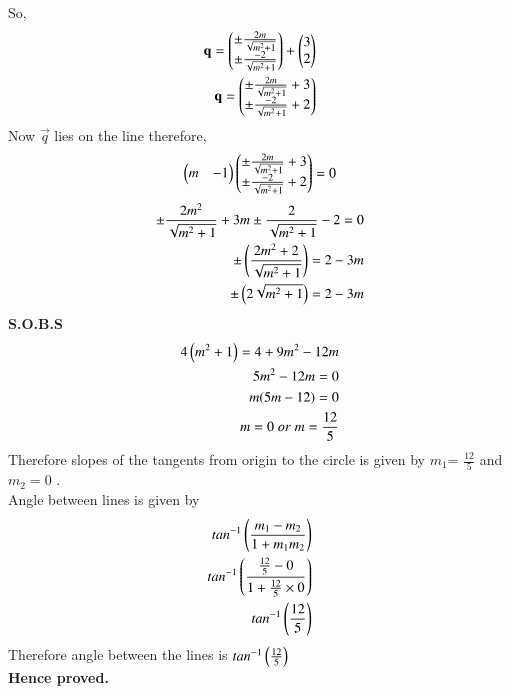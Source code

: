 \documentclass[journal,12pt,twocolumn]{IEEEtran}
\begin{document}
So,
\begin{align}
    \mathbf{q}=\begin{pmatrix}\pm \frac{2m}{\sqrt{m^2+1}} \\ \pm \frac{-2}{\sqrt{m^2+1}} \end{pmatrix} + \begin{pmatrix}3 \\ 2\end{pmatrix}\\
    \mathbf{q}= \begin{pmatrix}\pm \frac{2m}{\sqrt{m^2+1} }+3 \\ \pm \frac{-2}{\sqrt{m^2+1}} +2\end{pmatrix}
\end{align}
Now $\vec{q}$ lies on the line therefore,
\begin{align}
   \begin{pmatrix}m & -1\end{pmatrix} \begin{pmatrix}\pm \frac{2m}{\sqrt{m^2+1} }+3 \\ \pm \frac{-2}{\sqrt{m^2+1}} +2\end{pmatrix}  = 0
\end{align}
\begin{align}
    \pm \frac{2m^2}{\sqrt{m^2+1}}+ 3m  \pm\frac{2}{\sqrt{m^2+1}} -2=0 \\
    \pm\left(\frac{2m^2 + 2}{\sqrt{m^2+1}}\right)= 2-3m\\
    \pm \left(2\sqrt{m^2+1}\right)= 2-3m
\end{align}
\textbf{S.O.B.S}
\begin{align}
    4\left(m^2+1\right)=4 + 9m^2 -12m\\
    5m^2-12m=0\\
    m(5m-12)=0\\
    m=0 \;or\; m = \frac{12}{5}
\end{align}
Therefore slopes of the tangents from origin to the circle is given by  $m_1$= $\frac{12}{5}$ and $m_2=0$ .\\
Angle between lines is given by 
\begin{align}
    tan^{-1}\left(\frac{m_1-m_2}{1+m_1 m_2}\right)\\
    tan^{-1} \left(\frac{\frac{12}{5}-0}{1+\frac{12}{5}\times0}\right)\\
    tan^{-1}\left(\frac{12}{5}\right)
\end{align}
Therefore angle between the lines is $tan^{-1}\left(\frac{12}{5}\right)$ \\
\textbf{Hence proved.}
\end{document}
